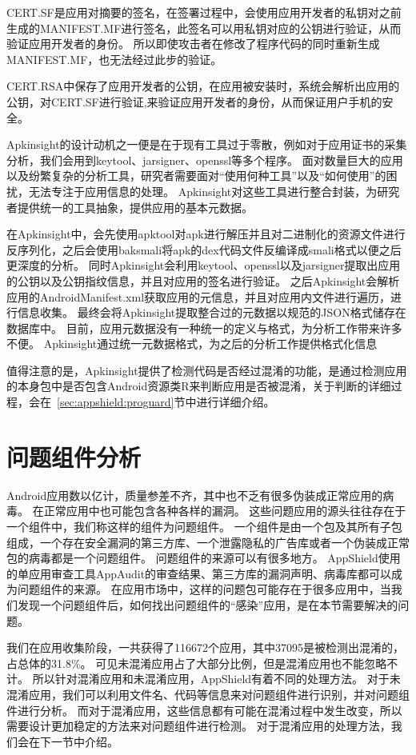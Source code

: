 CERT.SF是应用对摘要的签名，在签署过程中，会使用应用开发者的私钥对之前生成的MANIFEST.MF进行签名，此签名可以用私钥对应的公钥进行验证，从而验证应用开发者的身份。
所以即使攻击者在修改了程序代码的同时重新生成MANIFEST.MF，也无法经过此步的验证。

CERT.RSA中保存了应用开发者的公钥，在应用被安装时，系统会解析出应用的公钥，对CERT.SF进行验证,来验证应用开发者的身份，从而保证用户手机的安全。

Apkinsight的设计动机之一便是在于现有工具过于零散，例如对于应用证书的采集分析，我们会用到keytool、jarsigner、openssl等多个程序。
面对数量巨大的应用以及纷繁复杂的分析工具，研究者需要面对“使用何种工具”以及“如何使用”的困扰，无法专注于应用信息的处理。
Apkinsight对这些工具进行整合封装，为研究者提供统一的工具抽象，提供应用的基本元数据。

在Apkinsight中，会先使用apktool对apk进行解压并且对二进制化的资源文件进行反序列化，之后会使用baksmali将apk的dex代码文件反编译成smali格式以便之后更深度的分析。
同时Apkinsight会利用keytool、openssl以及jarsigner提取出应用的公钥以及公钥指纹信息，并且对应用的签名进行验证。
之后Apkinsight会解析应用的AndroidManifest.xml获取应用的元信息，并且对应用内文件进行遍历，进行信息收集。
最终会将Apkinsight提取整合过的元数据以规范的JSON格式储存在数据库中。
目前，应用元数据没有一种统一的定义与格式，为分析工作带来许多不便。
Apkinsight通过统一元数据格式，为之后的分析工作提供格式化信息

值得注意的是，Apkinsight提供了检测代码是否经过混淆的功能，是通过检测应用的本身包中是否包含Android资源类R来判断应用是否被混淆，关于判断的详细过程，会在~\ref{sec:appshield:proguard}节中进行详细介绍。

\section{问题组件分析}
\label{sec:appshield:comp-analysis}

Android应用数以亿计，质量参差不齐，其中也不乏有很多伪装成正常应用的病毒。
在正常应用中也可能包含各种各样的漏洞。
这些问题应用的源头往往存在于一个组件中，我们称这样的组件为问题组件。
一个组件是由一个包及其所有子包组成，一个存在安全漏洞的第三方库、一个泄露隐私的广告库或者一个伪装成正常包的病毒都是一个问题组件。
问题组件的来源可以有很多地方。
AppShield使用的单应用审查工具AppAudit的审查结果、第三方库的漏洞声明、病毒库都可以成为问题组件的来源。
在应用市场中，这样的问题包可能存在于很多应用中，当我们发现一个问题组件后，如何找出问题组件的“感染”应用，是在本节需要解决的问题。

我们在应用收集阶段，一共获得了116672个应用，其中37095是被检测出混淆的，占总体的31.8\%。
可见未混淆应用占了大部分比例，但是混淆应用也不能忽略不计。
所以针对混淆应用和未混淆应用，AppShield有着不同的处理方法。
对于未混淆应用，我们可以利用文件名、代码等信息来对问题组件进行识别，并对问题组件进行分析。
而对于混淆应用，这些信息都有可能在混淆过程中发生改变，所以需要设计更加稳定的方法来对问题组件进行检测。
对于混淆应用的处理方法，我们会在下一节中介绍。





